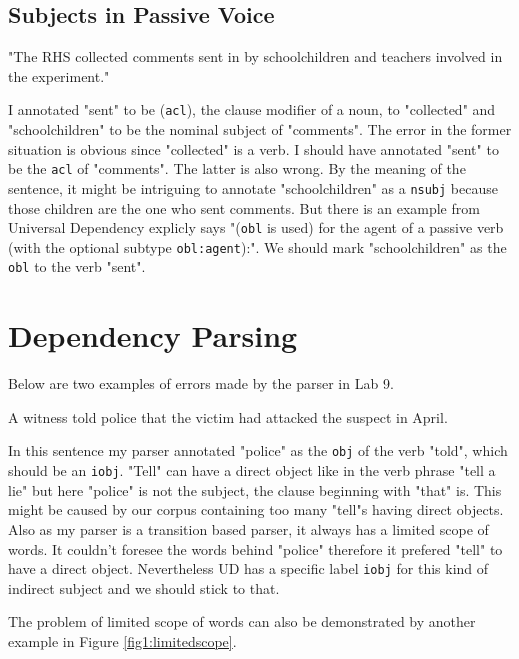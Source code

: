 \documentclass[11pt]{article} %
\begin{document}
\subsection{Subjects in Passive Voice}

\begin{displayquote}
  "The RHS collected comments sent in by schoolchildren and teachers involved in the experiment."
\end{displayquote}

I annotated "sent" to be (\texttt{acl}), the clause modifier of a noun, to "collected" and "schoolchildren" to be the nominal subject of "comments". The error in the former situation is obvious since "collected" is a verb\cite{AclUD}. I should have annotated "sent" to be the \texttt{acl} of "comments". The latter is also wrong. By the meaning of the sentence, it might be intriguing to annotate "schoolchildren" as a \texttt{nsubj} because those children are the one who sent comments. But there is an example from Universal Dependency  explicly says "(\texttt{obl} is used) for the agent of a passive verb (with the optional subtype \texttt{obl:agent}):"\cite{OblUD}. We should mark "schoolchildren" as the \texttt{obl} to the verb "sent".

\section{Dependency Parsing}

Below are two examples of errors made by the parser in Lab 9.

\begin{displayquote}
  A witness told police that the victim had attacked the suspect in April.
\end{displayquote}

In this sentence my parser annotated "police" as the \texttt{obj} of the verb "told", which should be an \texttt{iobj}. "Tell" can have a direct object like in the verb phrase "tell a lie" but here "police" is not the subject, the clause beginning with "that" is. This might be caused by our corpus containing too many "tell"s having direct objects. Also as my parser is a transition based parser, it always has a limited scope of words. It couldn't foresee the words behind "police" therefore it prefered "tell" to have a direct object. Nevertheless UD has a specific label \texttt{iobj} for this kind of indirect subject\cite{IobjUD} and we should stick to that.

The problem of limited scope of words can also be demonstrated by another example in Figure \ref{fig1:limitedscope}.
\end{document}
